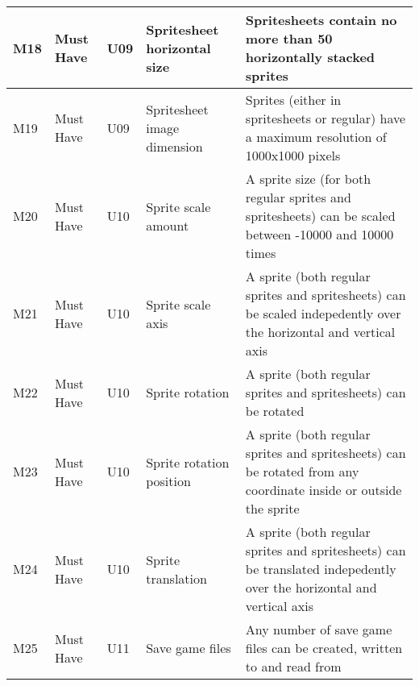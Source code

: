 \documentclass{article} %
\begin{document}
\begin{longtable}{|p{}|p{}|p{}|p{}|p{}|}
    M18                         & Must Have                          & U09                & Spritesheet horizontal size & Spritesheets contain no more than 50 horizontally stacked sprites                                                                                     \\ \hline
    M19                         & Must Have                          & U09                & Spritesheet image dimension & Sprites (either in spritesheets or regular) have a maximum resolution of 1000x1000 pixels                                                                   \\ \hline
    M20                         & Must Have                          & U10                & Sprite scale amount         & A sprite size (for both regular sprites and spritesheets) can be scaled between -10000 and 10000 times                                                      \\ \hline
    M21                         & Must Have                          & U10                & Sprite scale axis           & A sprite (both regular sprites and spritesheets) can be scaled indepedently over the horizontal and vertical axis                                           \\ \hline
    M22                         & Must Have                          & U10                & Sprite rotation             & A sprite (both regular sprites and spritesheets) can be rotated                                                                                             \\ \hline
    M23                         & Must Have                          & U10                & Sprite rotation position    & A sprite (both regular sprites and spritesheets) can be rotated from any coordinate inside or outside the sprite                                            \\ \hline
    M24                         & Must Have                          & U10                & Sprite translation          & A sprite (both regular sprites and spritesheets) can be translated indepedently over the horizontal and vertical axis                                       \\ \hline
    M25                         & Must Have                          & U11                & Save game files             & Any number of save game files can be created, written to and read from                                                                                      \\ \hline

\end{longtable}
\end{document}
